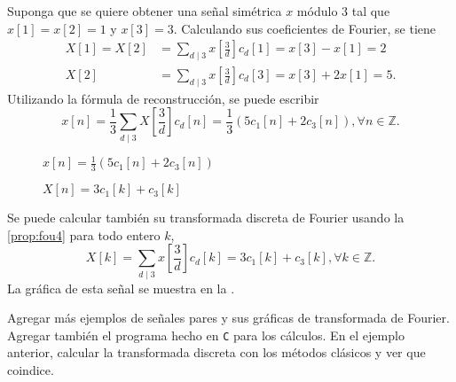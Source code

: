 \begin{example}
Suponga que se quiere obtener una señal simétrica $x$ módulo $3$ tal que $x[1]=x[2]=1$ y $x[3]=3$. Calculando sus coeficientes de Fourier, se tiene
\begin{align*}
    X[1] = X[2] & = \sum_{d \mid 3} x \left[ \frac{3}{d} \right] c_d[1] = x[3] - x[1] = 2 \\
    X[2] & = \sum_{d \mid 3} x \left[ \frac{3}{d} \right] c_d[3] = x[3] + 2 x[1] = 5.
\end{align*}
Utilizando la fórmula de reconstrucción, se puede escribir
\begin{equation*}
x[n] = \frac{1}{3} \sum_{d \mid 3} X \left[ \frac{3}{d} \right] c_d[n] = \frac{1}{3} \left( 5 c_1[n] + 2 c_3[n] \right), \forall n \in \mathbb{Z}.
\end{equation*}

\begin{figure}
\centering
\caption{$x[n] = \frac{1}{3} (5 c_1[n] + 2 c_3 [n])$}
\label{fig:plot1}
\end{figure}

\begin{figure}
\centering
\caption{$X[n] = 3 c_1[k] + c_3[k]$}
\label{fig:plot2}
\end{figure}

Se puede calcular también su transformada discreta de Fourier usando la \cref{prop:fou4} para todo entero $k$,
\begin{equation*}
    X[k] = \sum_{d \mid 3} x \left[ \frac{3}{d} \right] c_d[k] = 3 c_1[k] + c_3[k], \forall k \in \mathbb{Z}.
\end{equation*}
La gráfica de esta señal se muestra en la .
\end{example}

Agregar más ejemplos de señales pares y sus gráficas de transformada de Fourier. Agregar también el programa hecho en \texttt{C} para los cálculos. En el ejemplo anterior, calcular la transformada discreta con los métodos clásicos y ver que coindice.

